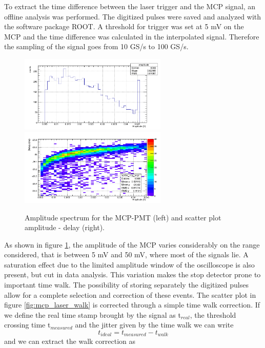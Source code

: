 To extract the time difference between the laser trigger and the MCP signal, an offline analysis was performed. The digitized pulses were saved and analyzed with the software package ROOT. A threshold for trigger was set at 5 mV on the MCP and the time difference was calculated in the interpolated signal. Therefore the sampling of the signal goes from 10 GS/s to 100 GS/s. 
\begin{figure}[htbp]
\begin{center}
\includegraphics[width=7cm]{../Pictures/Chapter_8/amp_MCP.png}
\includegraphics[width=7cm]{../Pictures/Chapter_8/time_walk_mcp.png}
\end{center}
\caption[Time walk of the MCP-PMT]{Amplitude spectrum for the MCP-PMT (left) and scatter plot amplitude - delay (right).}
\label{fig:mcp_laser}
\end{figure}
As shown in figure \ref{fig:mcp_laser}, the amplitude of the MCP varies considerably on the range considered, that is between 5 mV and 50 mV, where most of the signals lie. A saturation effect due to the limited amplitude window of the oscilloscope is also present, but cut in data analysis. This variation makes the stop detector prone to important time walk. 
The possibility of storing separately the digitized pulses allow for a complete selection and correction of these events. The scatter plot in figure \ref{fig:mcp_laser_walk} is corrected through a simple time walk correction.
If we define the real time stamp brought by the signal as t$_{real}$, the threshold crossing time t$_{measured}$ and the jitter given by the time walk we can write
\begin{equation}
t_{ideal} = t_{measured} - t_{walk}
\end{equation}
and we can extract the walk correction as
